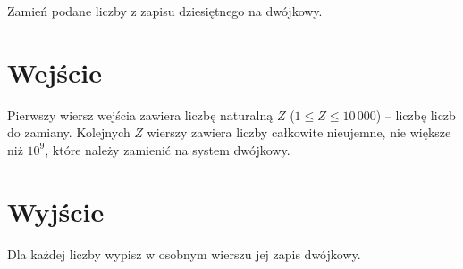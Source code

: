 \documentclass{spiral-kurs}
\begin{document}
  \makeheader
    Zamień podane liczby z zapisu dziesiętnego na dwójkowy.

  \section{Wejście}
    Pierwszy wiersz wejścia zawiera liczbę naturalną $Z$ ($1 \leq Z \leq 10\,000$) -- liczbę liczb do zamiany. Kolejnych $Z$ wierszy zawiera liczby całkowite nieujemne, nie większe niż $10^9$, które należy zamienić na system dwójkowy.

  \section{Wyjście}
      Dla każdej liczby wypisz w osobnym wierszu jej zapis dwójkowy.

\end{document}

